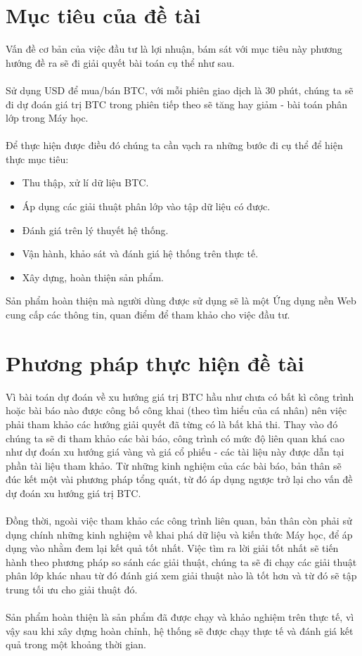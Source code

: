 \section{Mục tiêu của đề tài}
Vấn đề cơ bản của việc đầu tư là lợi nhuận, bám sát với mục tiêu này phương hướng 
đề ra sẽ đi giải quyết bài toán cụ thể như sau.\\\\
Sử dụng USD để mua/bán BTC, với mỗi phiên giao dịch là 30 phút, chúng 
ta sẽ đi dự đoán giá trị BTC trong phiên tiếp theo sẽ tăng hay giảm - bài
toán phân lớp trong Máy học.\\\\
Để thực hiện được điều đó chúng ta cần vạch ra những bước đi cụ
thể để hiện thực mục tiêu:
\begin{itemize}
  \item Thu thập, xử lí dữ liệu BTC.
  \item Áp dụng các giải thuật phân lớp vào tập dữ liệu có được.
  \item Đánh giá trên lý thuyết hệ thống.
  \item Vận hành, khảo sát và đánh giá hệ thống trên thực tế.
  \item Xây dựng, hoàn thiện sản phẩm.
\end{itemize} 
Sản phẩm hoàn thiện mà người dùng được sử dụng sẽ là một Ứng dụng nền Web cung 
cấp các thông tin, quan điểm để tham khảo cho việc đầu tư.
\section{Phương pháp thực hiện đề tài}
Vì bài toán dự đoán về xu hướng giá trị BTC hầu như chưa có bất kì 
công trình hoặc bài báo nào được công bố công khai (theo tìm hiểu của cá nhân) 
nên việc phải tham khảo các hướng giải quyết đã từng có là bất khả thi. Thay vào 
đó chúng ta sẽ đi tham khảo các bài báo, công trình có mức độ liên quan khá cao 
như dự đoán xu hướng giá vàng và giá cổ phiếu - các tài liệu này được dẫn tại 
phần tài liệu tham khảo.
Từ những kinh nghiệm của các bài báo, bản thân sẽ đúc kết một vài phương pháp 
tổng quát, từ đó áp dụng ngược trở lại cho vấn đề dự đoán xu hướng giá trị 
BTC.\\\\
Đồng thời, ngoài việc tham khảo các công trình liên quan, bản thân còn phải 
sử dụng chính những kinh nghiệm về khai phá dữ liệu và kiến thức Máy học, 
để áp dụng vào nhằm đem lại kết quả tốt nhất. Việc tìm ra lời giải tốt nhất sẽ 
tiến hành theo phương pháp so sánh các giải thuật, chúng ta sẽ đi chạy các giải 
thuật phân lớp khác nhau từ đó đánh giá xem giải thuật nào là tốt hơn và từ đó 
sẽ tập trung tối ưu cho giải thuật đó.\\\\
Sản phẩm hoàn thiện là sản phẩm đã được chạy và khảo nghiệm trên thực tế, vì vậy 
sau khi xây dựng hoàn chỉnh, hệ thống sẽ được chạy thực tế và đánh giá kết quả 
trong một khoảng thời gian.
